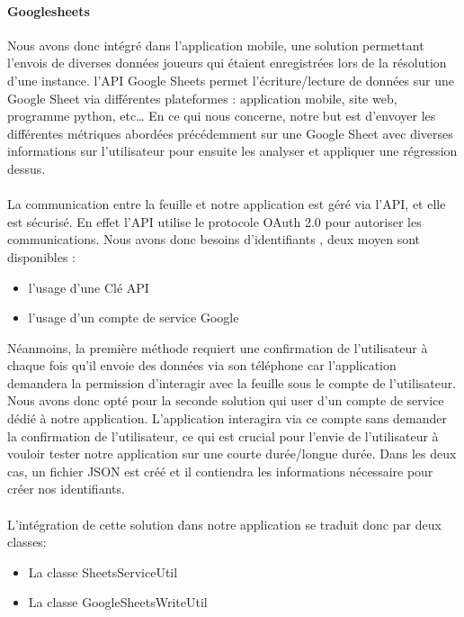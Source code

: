 \documentclass[a4paper, 10pt]{article}
\begin{document}
\paragraph{Googlesheets}
Nous avons donc intégré dans l’application mobile, une solution permettant l’envois de diverses données joueurs qui étaient enregistrées lors de la résolution d’une instance. l’API Google Sheets permet l’écriture/lecture de données sur une Google Sheet via différentes plateformes : application mobile, site web, programme python, etc… 
En ce qui nous concerne, notre but est d’envoyer les différentes métriques abordées précédemment sur une Google Sheet avec diverses informations sur l’utilisateur pour ensuite les analyser et appliquer une régression dessus.

\paragraph{}
La communication entre la feuille et notre application est géré via l’API, et elle est sécurisé. En effet l’API utilise le protocole OAuth 2.0 pour autoriser les communications. Nous avons donc besoins d’identifiants , deux moyen sont disponibles :
 \begin{itemize}
\item l’usage d’une Clé API
\item l’usage d’un compte de service Google
\end{itemize}
Néanmoins, la première méthode requiert une confirmation de l’utilisateur à chaque fois qu’il envoie des données via son téléphone car l’application demandera la permission d'interagir avec la feuille sous le compte de l’utilisateur. Nous avons donc opté pour la seconde solution qui user d’un compte de service dédié à notre application. L’application interagira via ce compte sans demander la confirmation de l’utilisateur, ce qui est crucial pour l’envie de l’utilisateur à vouloir tester notre application sur une courte durée/longue durée.
Dans les deux cas, un fichier JSON est créé et il contiendra les informations nécessaire pour créer nos identifiants.

\paragraph{}
L’intégration de cette solution dans notre application se traduit donc par deux classes:
 \begin{itemize}
\item La classe SheetsServiceUtil
\item La classe GoogleSheetsWriteUtil
\end{itemize}
\end{document}
